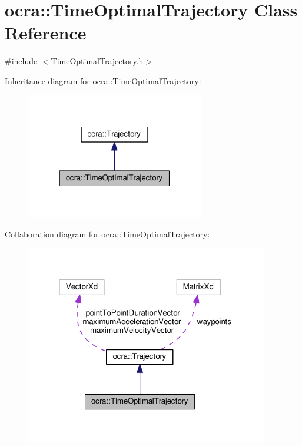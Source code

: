 \hypertarget{classocra_1_1TimeOptimalTrajectory}{}\section{ocra\+:\+:Time\+Optimal\+Trajectory Class Reference}
\label{classocra_1_1TimeOptimalTrajectory}


{\ttfamily \#include $<$Time\+Optimal\+Trajectory.\+h$>$}



Inheritance diagram for ocra\+:\+:Time\+Optimal\+Trajectory\+:
\nopagebreak
\begin{figure}[H]
\begin{center}
\leavevmode
\includegraphics[width=220pt]{d8/d53/classocra_1_1TimeOptimalTrajectory__inherit__graph}
\end{center}
\end{figure}


Collaboration diagram for ocra\+:\+:Time\+Optimal\+Trajectory\+:
\nopagebreak
\begin{figure}[H]
\begin{center}
\leavevmode
\includegraphics[width=301pt]{d5/d36/classocra_1_1TimeOptimalTrajectory__coll__graph}
\end{center}
\end{figure}
